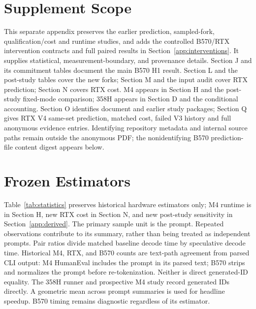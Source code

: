 \documentclass{article}
\begin{document}
\printAffiliationsAndNotice{}
\appendix
\renewcommand{\thetable}{A\arabic{table}}
\section{Supplement Scope}
This separate appendix preserves the earlier prediction, sampled-fork, qualification/cost and runtime studies, and adds the controlled B570/RTX intervention contracts and full paired results in Section~\ref{app:interventions}. It supplies statistical, measurement-boundary, and provenance details. Section J and its commitment tables document the main B570 H1 result. Section L and the post-study tables cover the new forks; Section M and the input audit cover RTX prediction; Section N covers RTX cost. M4 appears in Section H and the post-study fixed-mode comparison; 358H appears in Section D and the conditional accounting. Section O identifies document and earlier study packages; Section Q gives RTX V4 same-set prediction, matched cost, failed V3 history and full anonymous evidence entries. Identifying repository metadata and internal source paths remain outside the anonymous PDF; the nonidentifying B570 prediction-file content digest appears below.

\section{Frozen Estimators}
Table~\ref{tab:statistics} preserves historical hardware estimators only; M4 runtime is in Section H, new RTX cost in Section N, and new post-study sensitivity in Section~\ref{app:derived}. The primary sample unit is the prompt. Repeated observations contribute to its summary, rather than being treated as independent prompts. Pair ratios divide matched baseline decode time by speculative decode time. Historical M4, RTX, and B570 counts are text-path agreement from parsed CLI output: M4 HumanEval includes the prompt in its parsed text; B570 strips and normalizes the prompt before re-tokenization. Neither is direct generated-ID equality. The 358H runner and prospective M4 study record generated IDs directly. A geometric mean across prompt summaries is used for headline speedup. B570 timing remains diagnostic regardless of its estimator.
\end{document}
